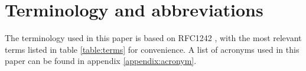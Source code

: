 
\section{Terminology and abbreviations}\label{sec:terminology}
The terminology used in this paper is based on RFC1242 \cite{rfc1242}, with the most relevant terms listed in table \ref{table:terms} for convenience.
A list of acronyms used in this paper can be found in appendix \ref{appendix:acronym}.

